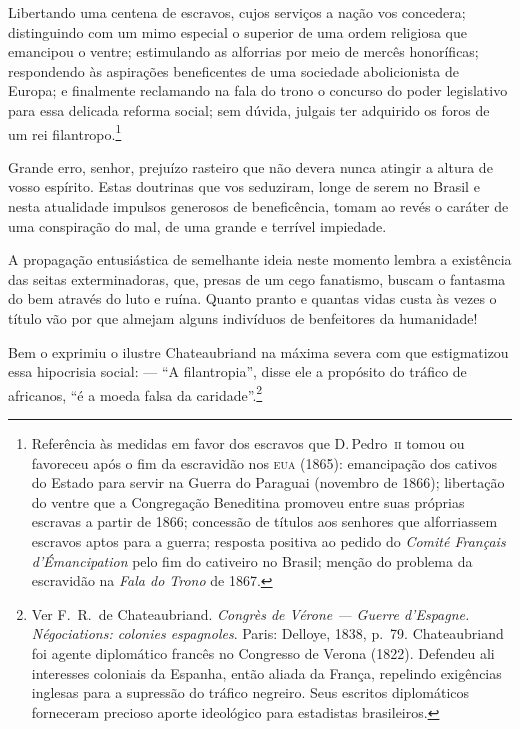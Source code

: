 \begin{linenumbers}
Libertando uma centena de escravos, cujos serviços a nação vos
concedera; distinguindo com um mimo especial o superior de uma ordem
religiosa que emancipou o ventre; estimulando as alforrias por meio de
mercês honoríficas; respondendo às aspirações beneficentes de uma 
sociedade abolicionista de Europa; e finalmente reclamando na fala do
trono o concurso do poder legislativo para essa delicada reforma
social; sem dúvida, julgais ter adquirido os foros de um rei
filantropo.\footnote{ Referência às medidas em favor dos escravos que D.\,Pedro~\textsc{ii} 
tomou ou favoreceu após o fim da escravidão nos \textsc{eua} (1865): emancipação dos cativos 
do Estado para servir na Guerra do Paraguai (novembro de 1866); libertação do ventre que a 
Congregação Beneditina promoveu entre suas próprias escravas a partir de 1866; concessão de 
títulos aos senhores que alforriassem escravos aptos para a guerra; resposta positiva ao 
pedido do \textit{Comité Français d'Émancipation} pelo fim do cativeiro no Brasil; 
menção do problema da escravidão na \textit{Fala do Trono} de 1867.} 
 
Grande erro, senhor, prejuízo rasteiro que não devera nunca atingir a 
altura de vosso espírito. Estas doutrinas que vos seduziram, longe de
serem no Brasil e nesta atualidade impulsos generosos de beneficência,
tomam ao revés o caráter de uma conspiração do mal, de uma grande e
terrível impiedade.

A propagação entusiástica de semelhante ideia neste momento lembra a
existência das seitas exterminadoras, que, presas de um cego fanatismo,
buscam o fantasma do bem através do luto e ruína. Quanto pranto e
quantas vidas custa às vezes o título vão por que almejam alguns
indivíduos de benfeitores da humanidade!

Bem o exprimiu o ilustre Chateaubriand na máxima severa com que
estigmatizou essa hipocrisia social: --- ``A filantropia'', disse ele a
propósito do tráfico de africanos, ``é a moeda falsa da
caridade''.\footnote{ Ver F.~R.~de Chateaubriand. \textit{Congrès de Vérone --- 
Guerre d'Espagne. Négociations: colonies espagnoles}. Paris: Delloye, 1838, p.~79. 
Chateaubriand foi agente diplomático francês no Congresso 
de Verona (1822). Defendeu ali interesses coloniais da Espanha, então aliada da França, 
repelindo exigências inglesas para a supressão do tráfico negreiro. Seus escritos 
diplomáticos forneceram precioso aporte ideológico para estadistas brasileiros.}

\end{linenumbers}

